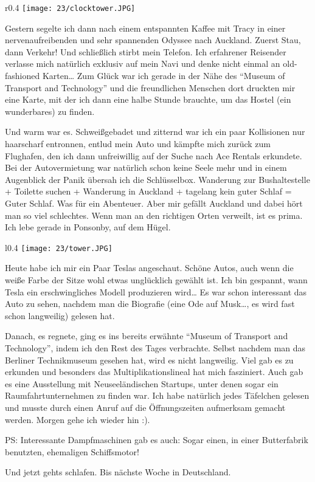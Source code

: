 \begin{wrapfigure}{r}{0.4\textwidth}
  \centering
  \texttt{[image: 23/clocktower.JPG]}
\end{wrapfigure}
Gestern segelte ich dann nach einem entspannten Kaffee mit Tracy in
einer nervenaufreibenden und sehr spannenden Odyssee nach Auckland.
Zuerst Stau, dann Verkehr! Und schließlich stirbt mein Telefon. Ich
erfahrener Reisender verlasse mich natürlich exklusiv auf mein Navi und
denke nicht einmal an old-fashioned Karten\ldots{} Zum Glück war ich
gerade in der Nähe des ``Museum of Transport and Technology'' und die
freundlichen Menschen dort druckten mir eine Karte, mit der ich dann
eine halbe Stunde brauchte, um das Hostel (ein wunderbares) zu finden.

Und warm war es. Schweißgebadet und zitternd war ich ein paar
Kollisionen nur haarscharf entronnen, entlud mein Auto und kämpfte
mich zurück zum Flughafen, den ich dann unfreiwillig auf der Suche
nach Ace Rentals erkundete. Bei der Autovermietung war natürlich schon
keine Seele mehr und in einem Augenblick der Panik übersah ich die
Schlüsselbox.  Wanderung zur Bushaltestelle + Toilette suchen +
Wanderung in Auckland + tagelang kein guter Schlaf = Guter Schlaf. Was
für ein Abenteuer. Aber mir gefällt Auckland und dabei hört man so
viel schlechtes. Wenn man an den richtigen Orten verweilt, ist es
prima. Ich lebe gerade in Ponsonby, auf dem Hügel.

\begin{wrapfigure}{l}{0.4\textwidth}
  \centering
  \texttt{[image: 23/tower.JPG]}
\end{wrapfigure}
Heute habe ich mir ein Paar Teslas angeschaut. Schöne Autos, auch wenn
die weiße Farbe der Sitze wohl etwas unglücklich gewählt ist. Ich bin
gespannt, wann Tesla ein erschwingliches Modell produzieren wird\ldots{}
Es war schon interessant das Auto zu sehen, nachdem man die Biografie
(eine Ode auf Musk\ldots, es wird fast schon langweilig) gelesen hat.

Danach, es regnete, ging es ins bereits erwähnte ``Museum of Transport
and Technology'', indem ich den Rest des Tages verbrachte. Selbst
nachdem man das Berliner Technikmuseum gesehen hat, wird es nicht
langweilig.  Viel gab es zu erkunden und besonders das
Multiplikationslineal hat mich fasziniert. Auch gab es eine
Ausstellung mit Neuseeländischen Startups, unter denen sogar ein
Raumfahrtunternehmen zu finden war. Ich habe natürlich jedes Täfelchen
gelesen und musste durch einen Anruf auf die Öffnungszeiten aufmerksam
gemacht werden. Morgen gehe ich wieder hin :).

PS: Interessante Dampfmaschinen gab es auch: Sogar einen, in einer
Butterfabrik benutzten, ehemaligen Schiffsmotor!

Und jetzt gehts schlafen. Bis nächste Woche in Deutschland.
